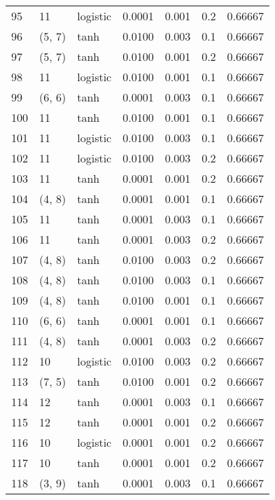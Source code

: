 \begin{tabular}{lllrrrr}
95  &          11 &  logistic &  0.0001 &  0.001 &  0.2 &   0.66667 \\
96  &      (5, 7) &      tanh &  0.0100 &  0.003 &  0.1 &   0.66667 \\
97  &      (5, 7) &      tanh &  0.0100 &  0.001 &  0.2 &   0.66667 \\
98  &          11 &  logistic &  0.0100 &  0.001 &  0.1 &   0.66667 \\
99  &      (6, 6) &      tanh &  0.0001 &  0.003 &  0.1 &   0.66667 \\
100 &          11 &      tanh &  0.0100 &  0.001 &  0.1 &   0.66667 \\
101 &          11 &  logistic &  0.0100 &  0.003 &  0.1 &   0.66667 \\
102 &          11 &  logistic &  0.0100 &  0.003 &  0.2 &   0.66667 \\
103 &          11 &      tanh &  0.0001 &  0.001 &  0.2 &   0.66667 \\
104 &      (4, 8) &      tanh &  0.0001 &  0.001 &  0.1 &   0.66667 \\
105 &          11 &      tanh &  0.0001 &  0.003 &  0.1 &   0.66667 \\
106 &          11 &      tanh &  0.0001 &  0.003 &  0.2 &   0.66667 \\
107 &      (4, 8) &      tanh &  0.0100 &  0.003 &  0.2 &   0.66667 \\
108 &      (4, 8) &      tanh &  0.0100 &  0.003 &  0.1 &   0.66667 \\
109 &      (4, 8) &      tanh &  0.0100 &  0.001 &  0.1 &   0.66667 \\
110 &      (6, 6) &      tanh &  0.0001 &  0.001 &  0.1 &   0.66667 \\
111 &      (4, 8) &      tanh &  0.0001 &  0.003 &  0.2 &   0.66667 \\
112 &          10 &  logistic &  0.0100 &  0.003 &  0.2 &   0.66667 \\
113 &      (7, 5) &      tanh &  0.0100 &  0.001 &  0.2 &   0.66667 \\
114 &          12 &      tanh &  0.0001 &  0.003 &  0.1 &   0.66667 \\
115 &          12 &      tanh &  0.0001 &  0.001 &  0.2 &   0.66667 \\
116 &          10 &  logistic &  0.0001 &  0.001 &  0.2 &   0.66667 \\
117 &          10 &      tanh &  0.0001 &  0.001 &  0.2 &   0.66667 \\
118 &      (3, 9) &      tanh &  0.0001 &  0.003 &  0.1 &   0.66667 \\

\end{tabular}
